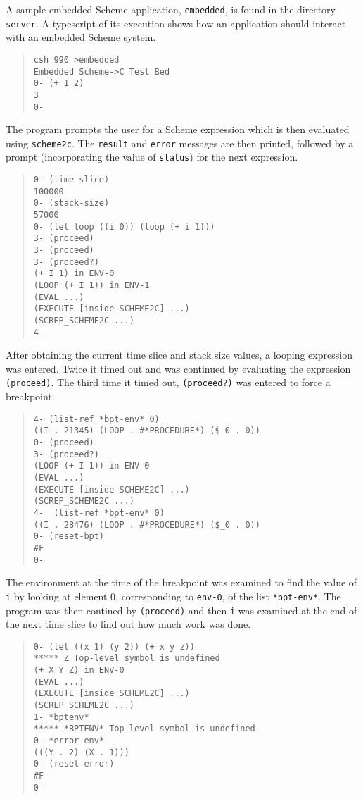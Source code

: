 \documentclass[12pt]{article}
\begin{document}
A sample embedded Scheme application, \texttt{embedded}, is found in
the directory \texttt{server}.  A typescript of its execution shows
how an application should interact with an embedded Scheme system.
\begin{quote}
\begin{verbatim}
csh 990 >embedded
Embedded Scheme->C Test Bed
0- (+ 1 2)
3
0-
\end{verbatim}
\end{quote}
The program prompts the user for a Scheme expression which is then
evaluated using \texttt{scheme2c}.  The \texttt{result} and
\texttt{error} messages are then printed, followed by a prompt
(incorporating the value of \texttt{status}) for the next expression.
\begin{quote}
\begin{verbatim}
0- (time-slice)
100000
0- (stack-size)
57000
0- (let loop ((i 0)) (loop (+ i 1)))
3- (proceed)
3- (proceed)
3- (proceed?)
(+ I 1) in ENV-0
(LOOP (+ I 1)) in ENV-1
(EVAL ...)
(EXECUTE [inside SCHEME2C] ...)
(SCREP_SCHEME2C ...)
4-
\end{verbatim}
\end{quote}
After obtaining the current time slice and stack size values, a
looping expression was entered.  Twice it timed out and was continued
by evaluating the expression \texttt{(proceed)}.  The third time it
timed out, \texttt{(proceed?)} was entered to force a breakpoint.
\begin{quote}
\begin{verbatim}
4- (list-ref *bpt-env* 0)
((I . 21345) (LOOP . #*PROCEDURE*) ($_0 . 0))
0- (proceed)
3- (proceed?)
(LOOP (+ I 1)) in ENV-0
(EVAL ...)
(EXECUTE [inside SCHEME2C] ...)
(SCREP_SCHEME2C ...)
4-  (list-ref *bpt-env* 0)
((I . 28476) (LOOP . #*PROCEDURE*) ($_0 . 0))
0- (reset-bpt)
#F
0-
\end{verbatim}
\end{quote}
The environment at the time of the breakpoint was examined to find the
value of \texttt{i} by looking at element 0, corresponding to
\texttt{env-0}, of the list \texttt{*bpt-env*}.  The program was then
contined by \texttt{(proceed)} and then \texttt{i} was examined at the
end of the next time slice to find out how much work was done.
\begin{quote}
\begin{verbatim}
0- (let ((x 1) (y 2)) (+ x y z))
***** Z Top-level symbol is undefined
(+ X Y Z) in ENV-0
(EVAL ...)
(EXECUTE [inside SCHEME2C] ...)
(SCREP_SCHEME2C ...)
1- *bptenv*
***** *BPTENV* Top-level symbol is undefined
0- *error-env*
(((Y . 2) (X . 1)))
0- (reset-error)
#F
0-
\end{verbatim}
\end{quote}
\end{document}
